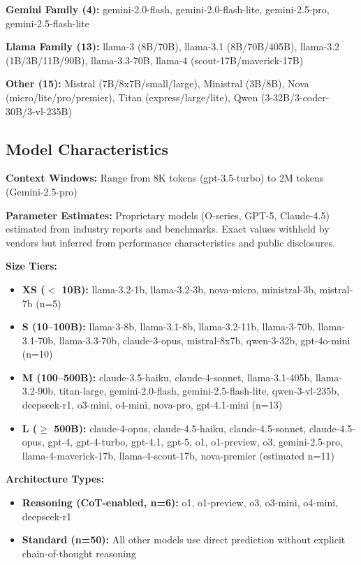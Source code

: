 \documentclass{article}
\begin{document}
\textbf{Gemini Family (4):} gemini-2.0-flash, gemini-2.0-flash-lite, gemini-2.5-pro, gemini-2.5-flash-lite

\textbf{Llama Family (13):} llama-3 (8B/70B), llama-3.1 (8B/70B/405B), llama-3.2 (1B/3B/11B/90B), llama-3.3-70B, llama-4 (scout-17B/maverick-17B)

\textbf{Other (15):} Mistral (7B/8x7B/small/large), Ministral (3B/8B), Nova (micro/lite/pro/premier), Titan (express/large/lite), Qwen (3-32B/3-coder-30B/3-vl-235B)

\subsection{Model Characteristics}

\textbf{Context Windows:} Range from 8K tokens (gpt-3.5-turbo) to 2M tokens (Gemini-2.5-pro)

\textbf{Parameter Estimates:} Proprietary models (O-series, GPT-5, Claude-4.5) estimated from industry reports and benchmarks. Exact values withheld by vendors but inferred from performance characteristics and public disclosures.

\textbf{Size Tiers:}
\begin{itemize}[itemsep=2pt,topsep=3pt,parsep=0pt]
    \item \textbf{XS ($<$ 10B):} llama-3.2-1b, llama-3.2-3b, nova-micro, ministral-3b, mistral-7b (n=5)
    \item \textbf{S (10--100B):} llama-3-8b, llama-3.1-8b, llama-3.2-11b, llama-3-70b, llama-3.1-70b, llama-3.3-70b, claude-3-opus, mistral-8x7b, qwen-3-32b, gpt-4o-mini (n=10)
    \item \textbf{M (100--500B):} claude-3.5-haiku, claude-4-sonnet, llama-3.1-405b, llama-3.2-90b, titan-large, gemini-2.0-flash, gemini-2.5-flash-lite, qwen-3-vl-235b, deepseek-r1, o3-mini, o4-mini, nova-pro, gpt-4.1-mini (n=13)
    \item \textbf{L ($\geq$ 500B):} claude-4-opus, claude-4.5-haiku, claude-4.5-sonnet, claude-4.5-opus, gpt-4, gpt-4-turbo, gpt-4.1, gpt-5, o1, o1-preview, o3, gemini-2.5-pro, llama-4-maverick-17b, llama-4-scout-17b, nova-premier (estimated n=11)
\end{itemize}

\textbf{Architecture Types:}
\begin{itemize}[itemsep=2pt,topsep=3pt,parsep=0pt]
    \item \textbf{Reasoning (CoT-enabled, n=6):} o1, o1-preview, o3, o3-mini, o4-mini, deepseek-r1
    \item \textbf{Standard (n=50):} All other models use direct prediction without explicit chain-of-thought reasoning
\end{itemize}
\end{document}
